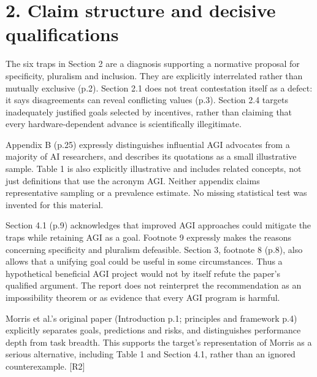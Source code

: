 \documentclass[10pt]{article}
\begin{document}
\section*{2. Claim structure and decisive qualifications}
The six traps in Section 2 are a diagnosis supporting a normative proposal for specificity, pluralism and inclusion. They are explicitly interrelated rather than mutually exclusive (p.2). Section 2.1 does not treat contestation itself as a defect: it says disagreements can reveal conflicting values (p.3). Section 2.4 targets inadequately justified goals selected by incentives, rather than claiming that every hardware-dependent advance is scientifically illegitimate.\par
Appendix B (p.25) expressly distinguishes influential AGI advocates from a majority of AI researchers, and describes its quotations as a small illustrative sample. Table 1 is also explicitly illustrative and includes related concepts, not just definitions that use the acronym AGI. Neither appendix claims representative sampling or a prevalence estimate. No missing statistical test was invented for this material.\par
Section 4.1 (p.9) acknowledges that improved AGI approaches could mitigate the traps while retaining AGI as a goal. Footnote 9 expressly makes the reasons concerning specificity and pluralism defeasible. Section 3, footnote 8 (p.8), also allows that a unifying goal could be useful in some circumstances. Thus a hypothetical beneficial AGI project would not by itself refute the paper’s qualified argument. The report does not reinterpret the recommendation as an impossibility theorem or as evidence that every AGI program is harmful.\par
Morris et al.’s original paper (Introduction p.1; principles and framework p.4) explicitly separates goals, predictions and risks, and distinguishes performance depth from task breadth. This supports the target’s representation of Morris as a serious alternative, including Table 1 and Section 4.1, rather than an ignored counterexample. [R2]\par
\end{document}
